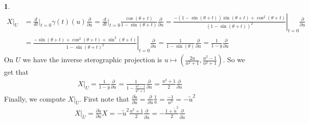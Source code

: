 \documentclass[10.5pt]{article}
\theoremstyle{definition}
\newtheorem{pb}{}
\begin{document}
\begin{pb}
        \begin{align*}
            X\vert_U &= \frac{d}{dt}\vert_{t=0} \gamma(t)(u) \frac{\partial}{\partial u}= \frac{d}{dt}\vert_{t=0} \frac{\cos(\theta + t)}{1 - \sin(\theta + t)} \frac{\partial}{\partial u}
            = \left.\frac{-(1-\sin(\theta+t))\sin(\theta+t)+\cos^2(\theta+t)}{(1-\sin(\theta+t))^2}\right\vert_{t=0} \frac{\partial}{\partial u}\\
            &= \left.\frac{-\sin(\theta + t) + \cos^2(\theta+t) + \sin^2(\theta + t)}{1 - \sin(\theta + t)^2}\right\vert_{t=0} \frac{\partial}{\partial u}
            = \frac{1}{1 - \sin(\theta)} \frac{\partial}{\partial u}  = \frac{1}{1 - y} \frac{\partial}{\partial u}
        \end{align*}
        On \(U\) we have the inverse sterographic projection is \(u \mapsto (\frac{2u}{u^2 + 1}, \frac{u^2 - 1}{u^2 + 1})\). So we get that
        \begin{align*}
            X\vert_U = \frac{1}{1 - y} \frac{\partial}{\partial u} = \frac{1}{1 - \frac{u^2 - 1}{u^2 + 1}} \frac{\partial}{\partial u} = \frac{u^2 + 1}{2} \frac{\partial}{\partial u}
        \end{align*}
        Finally, we compute \(X\vert_{\tilde{U}}\). First note that \(\frac{\partial \tilde{u}}{\partial u} = \frac{\partial}{\partial u} \frac{1}{u} = \frac{-1}{u^2} = -\tilde{u}^2\)
        \begin{align*}
            X\vert_{\tilde{U}} = \frac{\partial \tilde{u}}{\partial u} X = -\tilde{u}^2 \frac{u^2 + 1}{2} \frac{\partial}{\partial \tilde{u}} 
            = -\frac{1 + \tilde{u}^2}{2} \frac{\partial}{\partial \tilde{u}}
        \end{align*}
        
        

    \end{pb}
\end{document}
